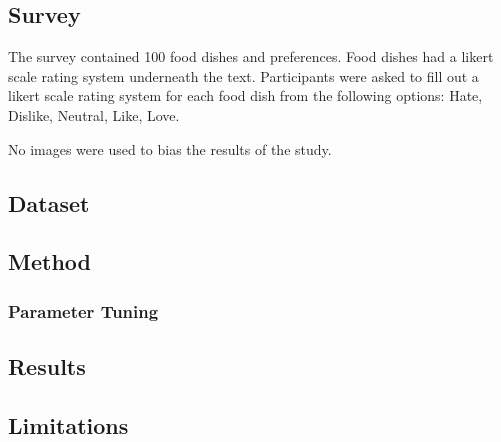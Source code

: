 
\subsection{Survey}
The survey contained 100 food dishes and  preferences. Food dishes had a likert scale rating system underneath the text. Participants were asked to fill out a likert scale rating system for each food dish from the following options: Hate, Dislike, Neutral, Like, Love. 

No images were used to bias the results of the study. 




\subsection{Dataset}
\subsection{Method}
\subsubsection{Parameter Tuning}
\subsection{Results}
\subsection{Limitations}



